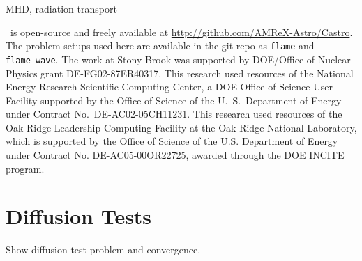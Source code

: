 \documentclass[twocolumn,times,tighten]{aastex62}
\newcommand{\castro}{{\sf Castro}}
\begin{document}
MHD, radiation transport


\acknowledgements \castro\ is open-source and freely available at
\url{http://github.com/AMReX-Astro/Castro}.  The problem setups used
here are available in the git repo as {\tt flame} and {\tt
  flame\_wave}.  The work at Stony Brook was supported by DOE/Office
of Nuclear Physics grant DE-FG02-87ER40317.  This research used
resources of the National Energy Research Scientific Computing Center,
a DOE Office of Science User Facility supported by the Office of
Science of the U.~S.\ Department of Energy under Contract
No.\ DE-AC02-05CH11231.  This research used resources of the Oak Ridge
Leadership Computing Facility at the Oak Ridge National Laboratory,
which is supported by the Office of Science of the U.S. Department of
Energy under Contract No. DE-AC05-00OR22725, awarded through the DOE
INCITE program.






\appendix

\section{Diffusion Tests}
\label{app:diffusion}

Show diffusion test problem and convergence.







\end{document}
